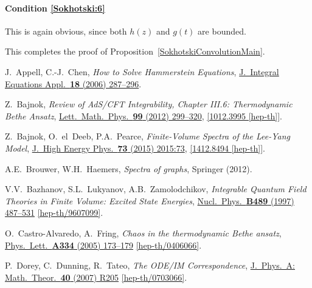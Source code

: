 \documentclass[12pt]{article}
\theoremstyle{plain}
\theoremstyle{definition}
\numberwithin{equation}{section}
\numberwithin{theorem}{section}
\begin{document}
\paragraph{Condition \ref{Sokhotski:6}} This is again obvious, since both $h(z)$ and $g(t)$ are bounded.

\medskip

This completes the proof of Proposition~\ref{SokhotskiConvolutionMain}.



\newcommand\arxiv[2]      {\href{http://arXiv.org/abs/#1}{#2}}
\newcommand\doi[2]        {\href{http://dx.doi.org/#1}{#2}}
\newcommand\httpurl[2]    {\href{http://#1}{#2}}

\begin{thebibliography}{YYY}
\setlength{\itemsep}{-0em}
\small

J.~Appell, C.-J.~Chen,
{\it How to Solve Hammerstein Equations},
\doi{10.1216/jiea/1181075392}{J.\ Integral Equations Appl.\ {\bf 18} (2006) 287--296}.

  Z.~Bajnok,
  {\it Review of AdS/CFT Integrability, Chapter III.6: Thermodynamic Bethe Ansatz},
  \doi{10.1007/s11005-011-0512-y}{Lett.\ Math.\ Phys.\
{\bf 99} (2012) 299--320},
  \arxiv{1012.3995}{[1012.3995 [hep-th]]}.

  Z.~Bajnok, O.~el~Deeb, P.A.~Pearce,
  {\it Finite-Volume Spectra of the Lee-Yang Model},
  \doi{10.1007/JHEP04(2015)073}{J.\ High Energy Phys.\ {\bf 73} (2015) 
  2015:73},
  \arxiv{1412.8494}{[1412.8494 [hep-th]]}.
    
  A.E.~Brouwer, W.H.~Haemers,
  {\it Spectra of graphs},
  {Springer (2012)}.
  
  V.V.~Bazhanov, S.L.~Lukyanov, A.B.~Zamolodchikov,
  {\it Integrable Quantum Field Theories in Finite Volume: Excited State Energies},
  \doi{10.1016/S0550-3213(97)00022-9}{Nucl.\ Phys.\ {\bf B489} (1997) 487--531}
  \arxiv{hep-th/9607099}{[hep-th/9607099]}.
  
  O.~Castro-Alvaredo, A.~Fring,
  {\it Chaos in the thermodynamic Bethe ansatz},
  \doi{10.1016/j.physleta.2004.11.009}{Phys.\ Lett.\ {\bf A334} (2005) 173--179}
  \arxiv{hep-th/0406066}{[hep-th/0406066]}.

  P.~Dorey, C.~Dunning, R.~Tateo,
  {\it The ODE/IM Correspondence},
  \doi{10.1088/1751-8113/40/32/R01}{J.\ Phys.\ A: Math.\ Theor.\ {\bf 40} (2007) R205}
  \arxiv{hep-th/0703066}{[hep-th/0703066]}.
  

\end{thebibliography}
\end{document}
